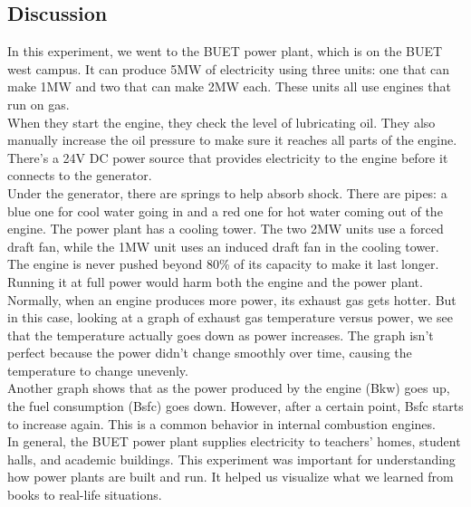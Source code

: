 \documentclass[12pt]{article}
\begin{document}
          \subsection*{Discussion}
          In this experiment, we went to the BUET power plant, which is on the BUET west campus. It can produce 5MW of electricity using three units: one that can make 1MW and two that can make 2MW each. These units all use engines that run on gas.\\

          When they start the engine, they check the level of lubricating oil. They also manually increase the oil pressure to make sure it reaches all parts of the engine. There's a 24V DC power source that provides electricity to the engine before it connects to the generator.\\

          Under the generator, there are springs to help absorb shock. There are pipes: a blue one for cool water going in and a red one for hot water coming out of the engine. The power plant has a cooling tower. The two 2MW units use a forced draft fan, while the 1MW unit uses an induced draft fan in the cooling tower.\\

          The engine is never pushed beyond 80\% of its capacity to make it last longer. Running it at full power would harm both the engine and the power plant.\\

          Normally, when an engine produces more power, its exhaust gas gets hotter. But in this case, looking at a graph of exhaust gas temperature versus power, we see that the temperature actually goes down as power increases. The graph isn't perfect because the power didn't change smoothly over time, causing the temperature to change unevenly.\\

          Another graph shows that as the power produced by the engine (Bkw) goes up, the fuel consumption (Bsfc) goes down. However, after a certain point, Bsfc starts to increase again. This is a common behavior in internal combustion engines.\\

          In general, the BUET power plant supplies electricity to teachers' homes, student halls, and academic buildings. This experiment was important for understanding how power plants are built and run. It helped us visualize what we learned from books to real-life situations. 
\end{document}
